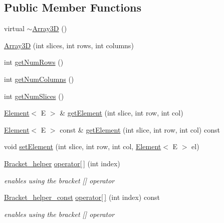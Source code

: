 \subsection*{Public Member Functions}
\begin{DoxyCompactItemize}
\item 
virtual \mbox{\hyperlink{classbridges_1_1datastructure_1_1_array3_d_afad3212fe6c2954859a7ea6dce7a739c}{$\sim$\+Array3D}} ()
\item 
\mbox{\hyperlink{classbridges_1_1datastructure_1_1_array3_d_af2d55bb9cf9057b9d5af4a24c6dc3173}{Array3D}} (int slices, int rows, int columns)
\item 
int \mbox{\hyperlink{classbridges_1_1datastructure_1_1_array3_d_a73aebe1098512ca4196cb8da0eb493fe}{get\+Num\+Rows}} ()
\item 
int \mbox{\hyperlink{classbridges_1_1datastructure_1_1_array3_d_acbd00c0c4448ff7ff03c76bc0701f602}{get\+Num\+Columns}} ()
\item 
int \mbox{\hyperlink{classbridges_1_1datastructure_1_1_array3_d_ad2fb0a0b8be702944c25b6fc807263f7}{get\+Num\+Slices}} ()
\item 
\mbox{\hyperlink{classbridges_1_1datastructure_1_1_element}{Element}}$<$ E $>$ \& \mbox{\hyperlink{classbridges_1_1datastructure_1_1_array3_d_a1e4a2bea4f3a292289cfc0a4d530108f}{get\+Element}} (int slice, int row, int col)
\item 
\mbox{\hyperlink{classbridges_1_1datastructure_1_1_element}{Element}}$<$ E $>$ const  \& \mbox{\hyperlink{classbridges_1_1datastructure_1_1_array3_d_a8f9d33a89196ef13839f30334b25476d}{get\+Element}} (int slice, int row, int col) const
\item 
void \mbox{\hyperlink{classbridges_1_1datastructure_1_1_array3_d_aaad4c68544d51cade79f318230ab2bcf}{set\+Element}} (int slice, int row, int col, \mbox{\hyperlink{classbridges_1_1datastructure_1_1_element}{Element}}$<$ E $>$ el)
\item 
\mbox{\hyperlink{structbridges_1_1datastructure_1_1_array3_d_1_1_bracket__helper}{Bracket\+\_\+helper}} \mbox{\hyperlink{classbridges_1_1datastructure_1_1_array3_d_a0b285b00e5d152d2968bee6b3aaf9349}{operator\mbox{[}$\,$\mbox{]}}} (int index)
\begin{DoxyCompactList}\small\item\em enables using the bracket \mbox{[}\mbox{]} operator \end{DoxyCompactList}\item 
\mbox{\hyperlink{structbridges_1_1datastructure_1_1_array3_d_1_1_bracket__helper__const}{Bracket\+\_\+helper\+\_\+const}} \mbox{\hyperlink{classbridges_1_1datastructure_1_1_array3_d_acfc0446c919e7ca70cc31d0624b3bcd1}{operator\mbox{[}$\,$\mbox{]}}} (int index) const
\begin{DoxyCompactList}\small\item\em enables using the bracket \mbox{[}\mbox{]} operator \end{DoxyCompactList}\end{DoxyCompactItemize}
